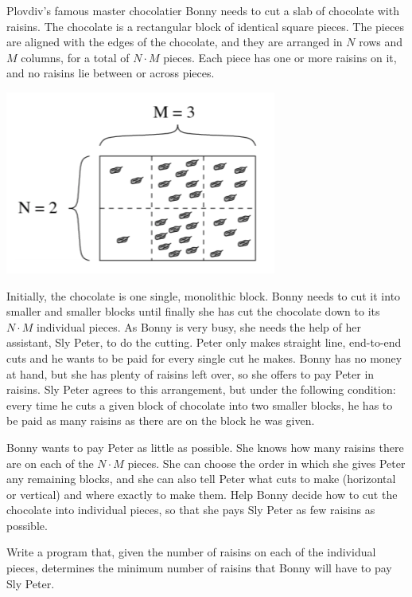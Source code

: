 Plovdiv's famous master chocolatier Bonny needs to cut a slab of chocolate with raisins. The chocolate is a rectangular block of identical square pieces. The pieces are aligned with the edges of the chocolate, and they are arranged in $N$ rows and $M$ columns, for a total of $N\cdot M$ pieces. Each piece has one or more raisins on it, and no raisins lie between or across pieces.

\includegraphics{raisins1.png}

Initially, the chocolate is one single, monolithic block. Bonny needs to cut it into smaller and smaller blocks until finally she has cut the chocolate down to its $N\cdot M$ individual pieces. As Bonny is very busy, she needs the help of her assistant, Sly Peter, to do the cutting. Peter only makes straight line, end-to-end cuts and he wants to be paid for every single cut he makes. Bonny has no money at hand, but she has plenty of raisins left over, so she offers to pay Peter in raisins. Sly Peter agrees to this arrangement, but under the following condition: every time he cuts a given block of chocolate into two smaller blocks, he has to be paid as many raisins as there are on the block he was given.

Bonny wants to pay Peter as little as possible. She knows how many raisins there are on each of the $N \cdot M$ pieces. She can choose the order in which she gives Peter any remaining blocks, and she can also tell Peter what cuts to make (horizontal or vertical) and where exactly to make them. Help Bonny decide how to cut the chocolate into individual pieces, so that she pays Sly Peter as few raisins as possible.

Write a program that, given the number of raisins on each of the individual pieces, determines the minimum number of raisins that Bonny will have to pay Sly Peter. 